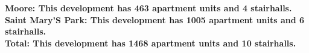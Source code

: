 \bf{Moore}: This development has 463 apartment units and 4 stairhalls.\\\bf{Saint Mary'S Park}: This development has 1005 apartment units and 6 stairhalls.\\\bf{Total}: This development has 1468 apartment units and 10 stairhalls.\\